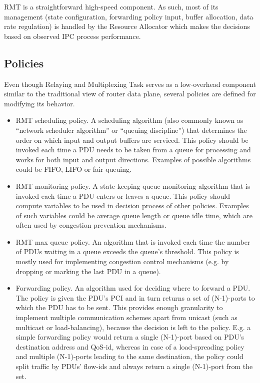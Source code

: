             RMT is a straightforward high-speed component. As such, most of its management (state configuration, forwarding policy input, buffer allocation, data rate regulation) is handled by the Resource Allocator which makes the decisions based on observed IPC process performance.


        \subsection{Policies}

            Even though Relaying and Multiplexing Task serves as a low-overhead component similar to the traditional view of router data plane, several policies are defined for modifying its behavior.

            \begin{itemize}
                \item RMT scheduling policy. A scheduling algorithm (also commonly known as ``network scheduler algorithm'' or ``queuing discipline'') that determines the order on which input and output buffers are serviced. This policy should be invoked each time a PDU needs to be taken from a queue for processing and works for both input and output directions. Examples of possible algorithms could be FIFO, LIFO or fair queuing.
                \item RMT monitoring policy. A state-keeping queue monitoring algorithm that is invoked each time a PDU enters or leaves a queue. This policy should compute variables to be used in decision process of other policies. Examples of such variables could be average queue length or queue idle time, which are often used by congestion prevention mechanisms.
                \item RMT max queue policy. An algorithm that is invoked each time the number of PDUs waiting in a queue exceeds the queue's threshold. This policy is mostly used for implementing congestion control mechanisms (e.g. by dropping or marking the last PDU in a queue).
                \item Forwarding policy. An algorithm used for deciding where to forward a PDU. The policy is given the PDU's PCI and in turn returns a set of (N-1)-ports to which the PDU has to be sent. This provides enough granularity to implement multiple communication schemes apart from unicast (such as multicast or load-balancing), because the decision is left to the policy. E.g. a simple forwarding policy would return a single (N-1)-port based on PDU's destination address and QoS-id, whereas in case of a load-spreading policy and multiple (N-1)-ports leading to the same destination, the policy could split traffic by PDUs' flow-ids and always return a single (N-1)-port from the set.
            \end{itemize}



